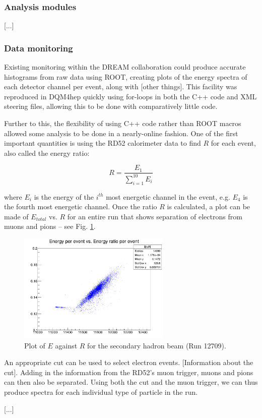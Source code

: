 \subsubsection{Analysis modules}
[...]

\subsubsection{Data monitoring}
Existing monitoring within the DREAM collaboration could produce accurate histograms from raw data using ROOT, creating plots of the energy spectra of each detector channel per event, along with [other things]. This facility was reproduced in DQM4hep quickly using for-loops in both the C++ code and XML steering files, allowing this to be done with comparatively little code.

Further to this, the flexibility of using C++ code rather than ROOT macros allowed some analysis to be done in a nearly-online fashion. One of the first important quantities is using the RD52 calorimeter data to find $R$ for each event, also called the energy ratio:

\begin{displaymath}
	R = \frac{E_1}{\sum_{i=1}^{10} E_i}
\end{displaymath}

where $E_i$ is the energy of the $i^{th}$ most energetic channel in the event, e.g. $E_4$ is the fourth most energetic channel. Once the ratio $R$ is calculated, a plot can be made of $E_{total}$ vs. $R$ for an entire run that shows separation of electrons from muons and pions -- see Fig. \ref{figure:testbeam/results/EvR}.

\begin{figure}[h]
	\centering
	\includegraphics[width=0.65\textwidth]{../Pictures/12709-EvR.png}
	\caption{Plot of $E$ against $R$ for the secondary hadron beam (Run 12709).}
	\label{figure:testbeam/results/EvR}
\end{figure}

An appropriate cut can be used to select electron events. [Information about the cut]. Adding in the information from the RD52's muon trigger, muons and pions can then also be separated. Using both the cut and the muon trigger, we can thus produce spectra for each individual type of particle in the run.


[...]